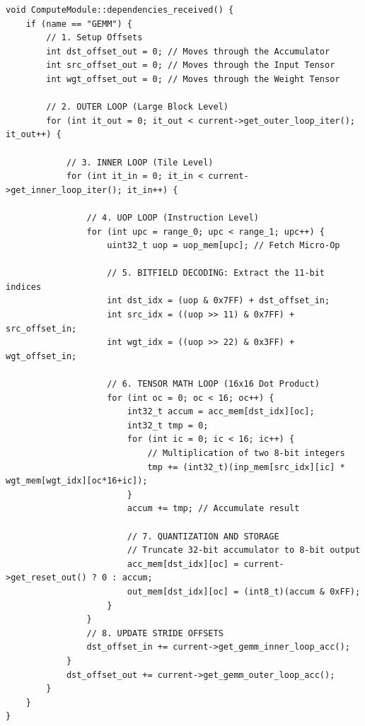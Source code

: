 \documentclass[11pt,a4paper]{report}
\begin{document}
\begin{lstlisting}
void ComputeModule::dependencies_received() {
    if (name == "GEMM") {
        // 1. Setup Offsets
        int dst_offset_out = 0; // Moves through the Accumulator
        int src_offset_out = 0; // Moves through the Input Tensor
        int wgt_offset_out = 0; // Moves through the Weight Tensor

        // 2. OUTER LOOP (Large Block Level)
        for (int it_out = 0; it_out < current->get_outer_loop_iter(); it_out++) {
            
            // 3. INNER LOOP (Tile Level)
            for (int it_in = 0; it_in < current->get_inner_loop_iter(); it_in++) {
                
                // 4. UOP LOOP (Instruction Level)
                for (int upc = range_0; upc < range_1; upc++) {
                    uint32_t uop = uop_mem[upc]; // Fetch Micro-Op
                    
                    // 5. BITFIELD DECODING: Extract the 11-bit indices
                    int dst_idx = (uop & 0x7FF) + dst_offset_in;
                    int src_idx = ((uop >> 11) & 0x7FF) + src_offset_in;
                    int wgt_idx = ((uop >> 22) & 0x3FF) + wgt_offset_in;

                    // 6. TENSOR MATH LOOP (16x16 Dot Product)
                    for (int oc = 0; oc < 16; oc++) {
                        int32_t accum = acc_mem[dst_idx][oc];
                        int32_t tmp = 0;
                        for (int ic = 0; ic < 16; ic++) {
                            // Multiplication of two 8-bit integers
                            tmp += (int32_t)(inp_mem[src_idx][ic] * wgt_mem[wgt_idx][oc*16+ic]);
                        }
                        accum += tmp; // Accumulate result
                        
                        // 7. QUANTIZATION AND STORAGE
                        // Truncate 32-bit accumulator to 8-bit output
                        acc_mem[dst_idx][oc] = current->get_reset_out() ? 0 : accum;
                        out_mem[dst_idx][oc] = (int8_t)(accum & 0xFF);
                    }
                }
                // 8. UPDATE STRIDE OFFSETS
                dst_offset_in += current->get_gemm_inner_loop_acc();
            }
            dst_offset_out += current->get_gemm_outer_loop_acc();
        }
    }
}
\end{lstlisting}
\end{document}
